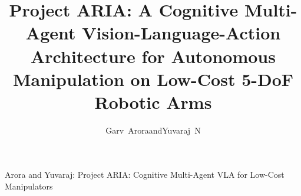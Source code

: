 \documentclass[journal]{IEEEtran}
\begin{document}
\title{Project ARIA: A Cognitive Multi-Agent Vision-Language-Action Architecture for Autonomous Manipulation on Low-Cost 5-DoF Robotic Arms}

\author{Garv~Arora\quad and\quad Yuvaraj~N}

%
{Arora and Yuvaraj: Project ARIA: Cognitive Multi-Agent VLA for Low-Cost Manipulators}

\maketitle
\end{document}
